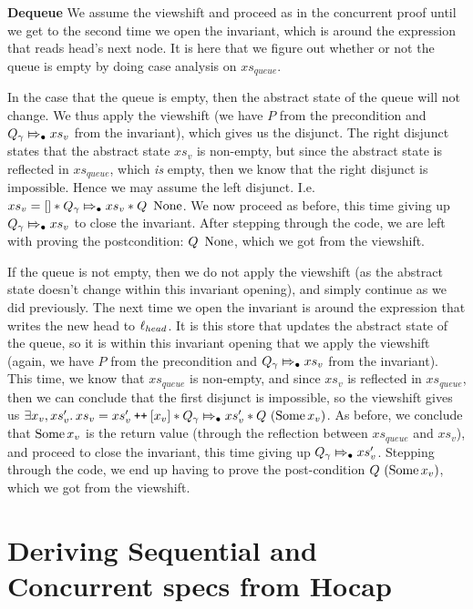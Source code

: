 \documentclass[twoside,11pt,openright]{report}
\newcommand{\Qg}{Q_\gname}
\newcommand\catenate{\mathbin{\text{\ttfamily\upshape ++}}}
\newcommand{\abstractstateauth}[2]{#1 \Mapsto_{\bullet} #2}
\begin{document}
\textbf{Dequeue} We assume the viewshift and proceed as in the concurrent proof until we get to the second time we open the invariant, which is around the expression that reads head's next node. It is here that we figure out whether or not the queue is empty by doing case analysis on $xs_{queue}$.

In the case that the queue is empty, then the abstract state of the queue will not change. We thus apply the viewshift (we have $P$ from the precondition and $\abstractstateauth{\Qg}{xs_v}$ from the invariant), which gives us the disjunct. The right disjunct states that the abstract state $xs_v$ is non-empty, but since the abstract state is reflected in $xs_{queue}$, which \emph{is} empty, then we know that the right disjunct is impossible. Hence we may assume the left disjunct. I.e. $xs_v = [] \star \abstractstateauth{\Qg}{xs_v} \star Q \ \None$. We now proceed as before, this time giving up $\abstractstateauth{\Qg}{xs_v}$ to close the invariant. After stepping through the code, we are left with proving the postcondition: $Q \ \operatorname{None}$, which we got from the viewshift.

If the queue is not empty, then we do not apply the viewshift (as the abstract state doesn't change within this invariant opening), and simply continue as we did previously. The next time we open the invariant is around the expression that writes the new head to $\ell_{head}$. It is this store that updates the abstract state of the queue, so it is within this invariant opening that we apply the viewshift (again, we have $P$ from the precondition and $\abstractstateauth{\Qg}{xs_v}$ from the invariant). This time, we know that $xs_{queue}$ is non-empty, and since $xs_v$ is reflected in $xs_{queue}$, then we can conclude that the first disjunct is impossible, so the viewshift gives us $\Exists x_v, xs_v' . xs_v = xs_v' \catenate [x_v] \star \abstractstateauth{\Qg}{xs_v'} \star Q \ (\Some{x_v})$. As before, we conclude that $\operatorname{Some}{x_v}$ is the return value (through the reflection between $xs_{queue}$ and $xs_v$), and proceed to close the invariant, this time giving up $\abstractstateauth{\Qg}{xs_v'}$. Stepping through the code, we end up having to prove the post-condition $Q \ (\operatorname{Some}{x_v})$, which we got from the viewshift.


\section{Deriving Sequential and Concurrent specs from Hocap}
\label{TLMSQ:section:deriving_seq_and_conc}
\end{document}
